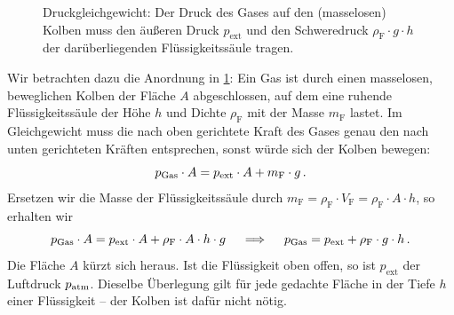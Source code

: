 \begin{figure}[htb]
    \centering
    \caption{Druckgleichgewicht: Der Druck des Gases auf den (masselosen) Kolben muss den äußeren Druck $p_{\text{ext}}$ und den Schweredruck $\rho_{\text{F}} \cdot g \cdot h$ der darüberliegenden Flüssigkeitssäule tragen.}\label{fig: druck_fluessigkeitssaeule_kolben}
\end{figure}

Wir betrachten dazu die Anordnung in \cref{fig: druck_fluessigkeitssaeule_kolben}: Ein Gas ist durch einen masselosen, beweglichen Kolben der Fläche $A$ abgeschlossen, auf dem eine ruhende Flüssigkeitssäule der Höhe $h$ und Dichte $\rho_{\text{F}}$ mit der Masse $m_\text{F}$ lastet. Im Gleichgewicht muss die nach oben gerichtete Kraft des Gases genau den nach unten gerichteten Kräften entsprechen, sonst würde sich der Kolben bewegen:
\begin{equation}\label{eq: druckgleichgewicht_kolben_fluessigkeit}
    p_{\text{Gas}} \cdot A = p_{\text{ext}} \cdot A + m_\text{F} \cdot g \,.
\end{equation}
Ersetzen wir die Masse der Flüssigkeitssäule durch $m_\text{F} = \rho_\text{F} \cdot V_\text{F} = \rho_\text{F} \cdot A \cdot h$, so erhalten wir
\begin{equation}
    p_{\text{Gas}} \cdot A = p_{\text{ext}} \cdot A + \rho_\text{F} \cdot A \cdot h \cdot g \quad \implies \quad p_{\text{Gas}} = p_{\text{ext}} + \rho_\text{F} \cdot g \cdot h \,.
\end{equation}
Die Fläche $A$ kürzt sich heraus. Ist die Flüssigkeit oben offen, so ist $p_{\text{ext}}$ der Luftdruck $p_{\mathrm{atm}}$. Dieselbe Überlegung gilt für jede gedachte Fläche in der Tiefe $h$ einer Flüssigkeit -- der Kolben ist dafür nicht nötig.

